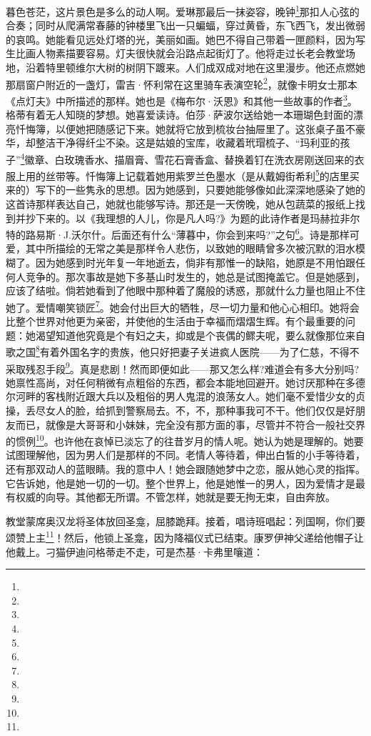 \par 暮色苍茫，这片景色是多么的动人啊。爱琳那最后一抹姿容，晚钟\footnote{}那扣人心弦的合奏；同时从爬满常春藤的钟楼里飞出一只蝙蝠，穿过黄昏，东飞西飞，发出微弱的哀鸣。她能看见远处灯塔的光，美丽如画。她巴不得自己带着一匣颜料，因为写生比画人物素描要容易。灯夫很快就会沿路点起街灯了。他将走过长老会教堂场地，沿着特里顿维尔大树的树阴下踱来。人们成双成对地在这里漫步。他还点燃她那扇窗户附近的一盏灯，雷吉·怀利常在这里骑车表演空轮\footnote{}，就像卡明女士那本《点灯夫》中所描述的那样。她也是《梅布尔·沃恩》和其他一些故事的作者\footnote{}。格蒂有着无人知晓的梦想。她喜爱读诗。伯莎·萨波尔送给她一本珊瑚色封面的漂亮忏悔簿，以便她把随感记下来。她就将它放到梳妆台抽屉里了。这张桌子虽不豪华，却整洁干净得纤尘不染。这是姑娘的宝库，收藏着玳瑁梳子、“玛利亚的孩子”\footnote{}徽章、白玫瑰香水、描眉膏、雪花石膏香盒、替换着钉在洗衣房刚送回来的衣服上用的丝带等。忏悔簿上记载着她用紫罗兰色墨水（是从戴姆街希利\footnote{}的店里买来的）写下的一些隽永的思想。因为她感到，只要她能够像如此深深地感染了她的这首诗那样表达自己，她就也能够写诗。那还是一天傍晚，她从包蔬菜的报纸上找到并抄下来的。以《我理想的人儿，你是凡人吗?》为题的此诗作者是玛赫拉非尔特的路易斯·J.沃尔什。后面还有什么“薄暮中，你会到来吗?”之句\footnote{}。诗是那样可爱，其中所描绘的无常之美是那样令人悲伤，以致她的眼睛曾多次被沉默的泪水模糊了。因为她感到时光年复一年地逝去，倘非有那惟一的缺陷，她原是不用怕跟任何人竞争的。那次事故是她下多基山时发生的，她总是试图掩盖它。但是她感到，应该了结啦。倘若她看到了他眼中那种着了魔般的诱惑，那就什么力量也阻止不住她了。爱情嘲笑锁匠\footnote{}。她会付出巨大的牺牲，尽一切力量和他心心相印。她将会比整个世界对他更为亲密，并使他的生活由于幸福而熠熠生辉。有个最重要的问题：她渴望知道他究竟是个有妇之夫，抑或是个丧偶的鳏夫呢，要么就像那位来自歌之国\footnote{}有着外国名字的贵族，他只好把妻子关进疯人医院——为了仁慈，不得不采取残忍手段\footnote{}。真是悲剧！然而即便如此——那又怎么样?难道会有多大分别吗?她禀性高尚，对任何稍微有点粗俗的东西，都会本能地回避开。她讨厌那种在多德尔河畔的客栈附近跟大兵以及粗俗的男人鬼混的浪荡女人。她们毫不爱惜少女的贞操，丢尽女人的脸，给抓到警察局去。不，不，那种事我可不干。他们仅仅是好朋友而已，就像是大哥哥和小妹妹，完全没有那方面的事，尽管并不符合一般社交界的惯例\footnote{}。也许他在哀悼已淡忘了的往昔岁月的情人呢。她认为她是理解的。她要试图理解他，因为男人们是那样的不同。老情人等待着，伸出白皙的小手等待着，还有那双动人的蓝眼睛。我的意中人！她会跟随她梦中之恋，服从她心灵的指挥。它告诉她，他是她一切的一切。整个世界上，他是她惟一的男人，因为爱情才是最有权威的向导。其他都无所谓。不管怎样，她就是要无拘无束，自由奔放。
\par 教堂蒙席奥汉龙将圣体放回圣龛，屈膝跪拜。接着，唱诗班唱起：列国啊，你们要颂赞上主\footnote{}！然后，他锁上圣龛，因为降福仪式已结束。康罗伊神父递给他帽子让他戴上。刁猫伊迪问格蒂走不走，可是杰基·卡弗里嚷道：

